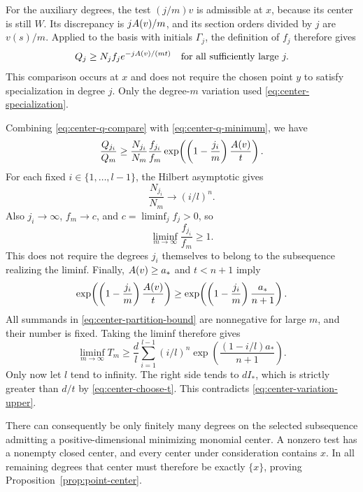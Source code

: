 For the auxiliary degrees, the test $(j/m)v$ is admissible at $x$,
because its center is still $W$. Its discrepancy is $jA(v)/m$, and
its section orders divided by $j$ are $v(s)/m$. Applied to the basis
with initials $\Gamma_j$, the definition of $f_j$ therefore gives
\begin{equation}\label{eq:center-q-compare}
 Q_j\ge N_j f_j e^{-jA(v)/(mt)}
 \quad\text{for all sufficiently large }j.
\end{equation}
This comparison occurs at $x$ and does not require the chosen point
$y$ to satisfy specialization in degree $j$. Only the degree-$m$
variation used \eqref{eq:center-specialization}.

Combining \eqref{eq:center-q-compare} with
\eqref{eq:center-q-minimum}, we have
\begin{equation}\label{eq:center-ratio}
 \frac{Q_{j_i}}{Q_m}
 \ge\frac{N_{j_i}}{N_m}\frac{f_{j_i}}{f_m}
      \exp\!\left(\left(1-\frac{j_i}{m}\right)
                         \frac{A(v)}{t}\right).
\end{equation}
For each fixed $i\in\{1,\ldots,l-1\}$, the Hilbert asymptotic gives
\[
 \frac{N_{j_i}}{N_m}\longrightarrow(i/l)^n.
\]
Also $j_i\to\infty$, $f_m\to c$, and $c=\liminf_j f_j>0$, so
\[
 \liminf_{m\to\infty}\frac{f_{j_i}}{f_m}\ge1.
\]
This does not require the degrees $j_i$ themselves to belong to the
subsequence realizing the liminf. Finally, $A(v)\ge a_*$ and
$t<n+1$ imply
\[
 \exp\!\left(\left(1-\frac{j_i}{m}\right)
                         \frac{A(v)}{t}\right)
 \ge
 \exp\!\left(\left(1-\frac{j_i}{m}\right)
                         \frac{a_*}{n+1}\right).
\]
All summands in \eqref{eq:center-partition-bound} are nonnegative for
large $m$, and their number is fixed. Taking the liminf therefore gives
\begin{equation}\label{eq:center-riemann-lower}
 \liminf_{m\to\infty}T_m
 \ge \frac dl\sum_{i=1}^{l-1}(i/l)^n
               \exp\!\left(\frac{(1-i/l)a_*}{n+1}\right).
\end{equation}
Only now let $l$ tend to infinity. The right side tends to $dI_*$,
which is strictly greater than $d/t$ by
\eqref{eq:center-choose-t}. This contradicts
\eqref{eq:center-variation-upper}.

There can consequently be only finitely many degrees on the selected
subsequence admitting a positive-dimensional minimizing monomial
center. A nonzero test has a nonempty closed center, and every center
under consideration contains $x$. In all remaining degrees that center
must therefore be exactly $\{x\}$, proving
Proposition~\ref{prop:point-center}.

